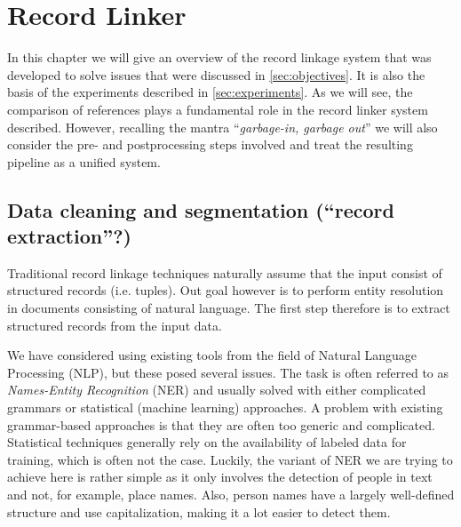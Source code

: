 
\section{Record Linker}
\label{sec:record_linker}

In this chapter we will give an overview of the record linkage system that was developed to solve issues that were discussed in \cref{sec:objectives}. It is also the basis of the experiments described in \cref{sec:experiments}.
As we will see, the comparison of references plays a fundamental role in the record linker system described.
However, recalling the mantra ``\emph{garbage-in, garbage out}'' we will also consider the pre- and postprocessing steps involved and treat the resulting pipeline as a unified system.




\subsection{Data cleaning and segmentation (``record extraction''?)}
\label{sec:segmentation}

Traditional record linkage techniques naturally assume that the input consist of structured records (i.e. tuples).
Out goal however is to perform entity resolution in documents consisting of natural language.
The first step therefore is to extract structured records from the input data.

We have considered using existing tools from the field of Natural Language Processing (NLP), but these posed several issues.
The task is often referred to as \emph{Names-Entity Recognition} (NER) and usually solved with either complicated grammars or statistical (machine learning) approaches.
A problem with existing grammar-based approaches is that they are often too generic and complicated.
Statistical techniques generally rely on the availability of labeled data for training, which is often not the case.
Luckily, the variant of NER we are trying to achieve here is rather simple as it only involves the detection of people in text and not, for example, place names.
Also, person names have a largely well-defined structure and use capitalization, making it a lot easier to detect them.

